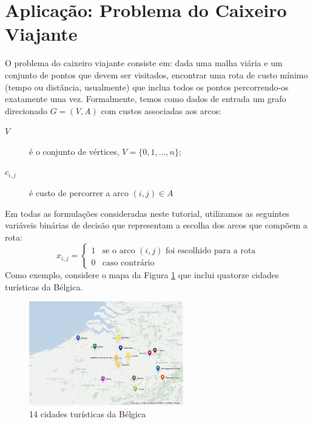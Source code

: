 \documentclass[a4paper,11pt,fleqn]{article}
\begin{document}
\section{Aplicação: Problema do Caixeiro Viajante}
\label{secTSP}

O problema do caixeiro viajante consiste em: dada uma malha viária e um conjunto de pontos que devem ser visitados, encontrar uma rota de custo mínimo (tempo ou distância, usualmente) que inclua todos os pontos percorrendo-os exatamente uma vez. 
Formalmente, temos como dados de entrada um grafo direcionado $G=(V,A)$ com custos associadas aos arcos:
\begin{description}
	\item [{$V$}] é o conjunto de vértices, $V=\{0,1,...,n\}$;
	\item [{$c_{i,j}$}] é custo de percorrer a arco $(i, j) \in A$
\end{description}

Em todas as formulações consideradas neste tutorial, utilizamos as seguintes variáveis binárias de decisão que representam a escolha dos arcos que compõem a rota:
\[
x_{i,j}=\begin{cases}
1 & \textrm{se o arco }(i,j)\textrm{ foi escolhido para a rota}\\
0 & \textrm{caso contrário}
\end{cases}
\]
Como exemplo, considere o mapa da Figura \ref{figG} que inclui quatorze cidades turísticas da Bélgica.

\begin{figure}
	\begin{centering}
		\includegraphics[width=0.6\textwidth]{../images/belgium-tourism-14.png}
		\par\end{centering}
	\caption{14 cidades turísticas da Bélgica}	
	\label{figG}
\end{figure}
\end{document}

